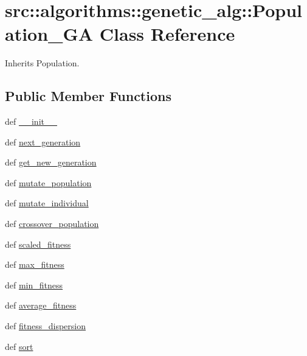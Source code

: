 \hypertarget{classsrc_1_1algorithms_1_1genetic__alg_1_1Population__GA}{
\section{src::algorithms::genetic\_\-alg::Population\_\-GA Class Reference}
\label{classsrc_1_1algorithms_1_1genetic__alg_1_1Population__GA}
}


Inherits Population.

\subsection*{Public Member Functions}
\begin{DoxyCompactItemize}
\item 
def \hyperlink{classsrc_1_1algorithms_1_1genetic__alg_1_1Population__GA_a1cccababdfce60e00e94e22c610148c0}{\_\-\_\-init\_\-\_\-}
\item 
def \hyperlink{classsrc_1_1algorithms_1_1genetic__alg_1_1Population__GA_a4715286c22f805102db1d11d37252f75}{next\_\-generation}
\item 
def \hyperlink{classsrc_1_1algorithms_1_1genetic__alg_1_1Population__GA_a6bc2cdc4c2ae68df504ec3ef3a24a48b}{get\_\-new\_\-generation}
\item 
def \hyperlink{classsrc_1_1algorithms_1_1genetic__alg_1_1Population__GA_adb33181bb3b46e1679df78669613d3ba}{mutate\_\-population}
\item 
def \hyperlink{classsrc_1_1algorithms_1_1genetic__alg_1_1Population__GA_ad857b29aef47f4d7f4a876c4c53acad7}{mutate\_\-individual}
\item 
def \hyperlink{classsrc_1_1algorithms_1_1genetic__alg_1_1Population__GA_a8c5e9ef3be020d639f0864e5a075e07a}{crossover\_\-population}
\item 
def \hyperlink{classsrc_1_1algorithms_1_1genetic__alg_1_1Population__GA_a44c9c7690772ea28648705efb658a2d9}{scaled\_\-fitness}
\item 
def \hyperlink{classsrc_1_1algorithms_1_1genetic__alg_1_1Population__GA_a21755c162ec0e7a06e9323e0698e2867}{max\_\-fitness}
\item 
def \hyperlink{classsrc_1_1algorithms_1_1genetic__alg_1_1Population__GA_a303f3f2c571137a7013e459aab5e18bb}{min\_\-fitness}
\item 
def \hyperlink{classsrc_1_1algorithms_1_1genetic__alg_1_1Population__GA_a192c94ef64823bd720c46ffe6d1c5596}{average\_\-fitness}
\item 
def \hyperlink{classsrc_1_1algorithms_1_1genetic__alg_1_1Population__GA_a8e7cafde9d8bcffb2b24dcc033a0f2a1}{fitness\_\-dispersion}
\item 
def \hyperlink{classsrc_1_1algorithms_1_1genetic__alg_1_1Population__GA_a08d0176e18c0996617731399460e1994}{sort}
\end{DoxyCompactItemize}


